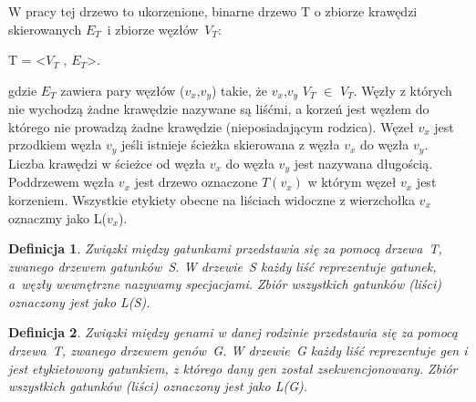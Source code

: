 \documentclass[licencjacka]{pracamgr}
\newtheorem{defi}{Definicja}[section]
\begin{document}
W pracy tej drzewo to ukorzenione, binarne drzewo T o zbiorze krawędzi skierowanych $E_T$~i zbiorze węzłów~$V_T$:
\begin{center}
T = <$V_T$ , $E_T$>.
\end{center}
gdzie $E_T$ zawiera pary węzłów ($v_x$,$v_y$) takie, że $v_x$,$v_y$ $V_T$ $\in$ $V_T$. Węzły z których nie wychodzą żadne krawędzie nazywane są liśćmi, a korzeń jest węzłem do którego nie prowadzą żadne krawędzie (nieposiadającym rodzica). Węzeł $v_x$ jest przodkiem węzła $v_y$ jeśli istnieje ścieżka skierowana z węzła $v_x$ do węzła $v_y$. Liczba krawędzi w ścieżce od węzła $v_x$ do węzła $v_y$ jest nazywana długością. Poddrzewem węzła $v_x$ jest drzewo oznaczone $T(v_x)$ w którym węzeł $v_x$ jest korzeniem. Wszystkie etykiety obecne na liściach widoczne z wierzchołka $v_x$ oznaczmy jako L($v_x$).


\begin{defi}\label{Drzewa gatunków}
  Związki między gatunkami przedstawia się za pomocą drzewa~T, zwanego drzewem gatunków~S. W drzewie~S każdy liść reprezentuje gatunek, a~węzły wewnętrzne nazywamy specjacjami. Zbiór wszystkich gatunków (liści) oznaczony jest jako L(S).
\end{defi}

\begin{defi}\label{Drzewa genów}
  Związki między genami w danej rodzinie przedstawia się za pomocą drzewa~T, zwanego drzewem genów~G. W drzewie~G każdy liść reprezentuje gen i jest etykietowony gatunkiem, z którego dany gen został zsekwencjonowany. Zbiór wszystkich gatunków (liści) oznaczony jest jako L(G).
\end{defi}
\end{document}
